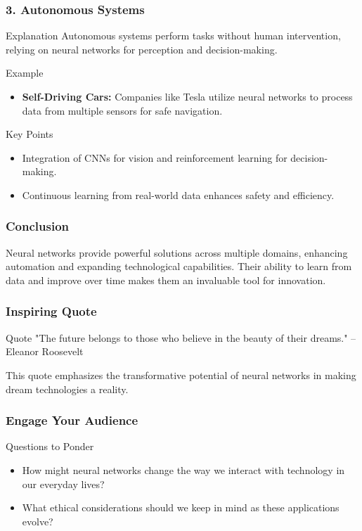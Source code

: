\documentclass[aspectratio=169]{beamer}
\begin{document}
\begin{frame}[fragile]
    \frametitle{3. Autonomous Systems}
    \begin{block}{Explanation}
        Autonomous systems perform tasks without human intervention, relying on neural networks for perception and decision-making.
    \end{block}
    
    \begin{block}{Example}
        \begin{itemize}
            \item \textbf{Self-Driving Cars:} Companies like Tesla utilize neural networks to process data from multiple sensors for safe navigation.
        \end{itemize}
    \end{block}
    
    \begin{block}{Key Points}
        \begin{itemize}
            \item Integration of CNNs for vision and reinforcement learning for decision-making.
            \item Continuous learning from real-world data enhances safety and efficiency.
        \end{itemize}
    \end{block}
\end{frame}

\begin{frame}[fragile]
    \frametitle{Conclusion}
    Neural networks provide powerful solutions across multiple domains, enhancing automation and expanding technological capabilities. Their ability to learn from data and improve over time makes them an invaluable tool for innovation.
\end{frame}

\begin{frame}[fragile]
    \frametitle{Inspiring Quote}
    \begin{block}{Quote}
        "The future belongs to those who believe in the beauty of their dreams." – Eleanor Roosevelt
    \end{block}
    This quote emphasizes the transformative potential of neural networks in making dream technologies a reality.
\end{frame}

\begin{frame}[fragile]
    \frametitle{Engage Your Audience}
    \begin{block}{Questions to Ponder}
        \begin{itemize}
            \item How might neural networks change the way we interact with technology in our everyday lives?
            \item What ethical considerations should we keep in mind as these applications evolve?
        \end{itemize}
    \end{block}
\end{frame}
\end{document}
